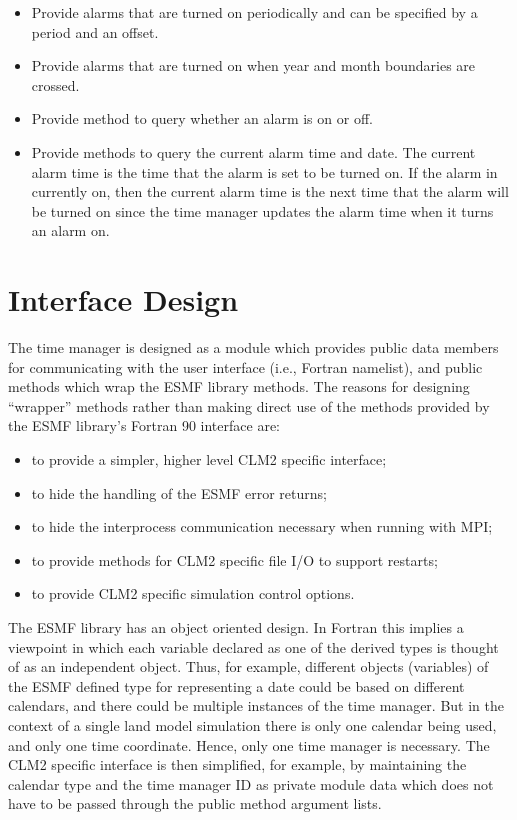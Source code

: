 \documentclass[12pt]{article}
\begin{document}
\begin{itemize}
\item
Provide alarms that are turned on periodically and can be specified by a period
and an offset.

\item
Provide alarms that are turned on when year and month boundaries are crossed.

\item
Provide method to query whether an alarm is on or off.

\item
Provide methods to query the current alarm time and date.  The current
alarm time is the time that the alarm is set to be turned on.  If
the alarm in currently on, then the current alarm time is the next time
that the alarm will be turned on since the time manager updates the alarm
time when it turns an alarm on.

\end{itemize}

\section{Interface Design}

The time manager is designed as a module which provides public data members
for communicating with the user interface (i.e., Fortran namelist), and
public methods which wrap the ESMF library methods.  The reasons for
designing ``wrapper'' methods rather than making direct use of the methods
provided by the ESMF library's Fortran 90 interface are:

\begin{itemize}
\item to provide a simpler, higher level CLM2 specific interface;
\item to hide the handling of the ESMF error returns;
\item to hide the interprocess communication necessary when running with MPI;
\item to provide methods for CLM2 specific file I/O to support restarts;
\item to provide CLM2 specific simulation control options.
\end{itemize}

The ESMF library has an object oriented design.  In Fortran this implies a
viewpoint in which each variable declared as one of the derived types is
thought of as an independent object.  Thus, for example, different objects
(variables) of the ESMF defined type for representing a date could be based
on different calendars, and there could be multiple instances of the time
manager.  But in the context of a single land model simulation there is
only one calendar being used, and only one time coordinate.  Hence, only
one time manager is necessary.  The CLM2 specific interface is then
simplified, for example, by maintaining the calendar type and the time
manager ID as private module data which does not have to be passed through
the public method argument lists.
\end{document}
